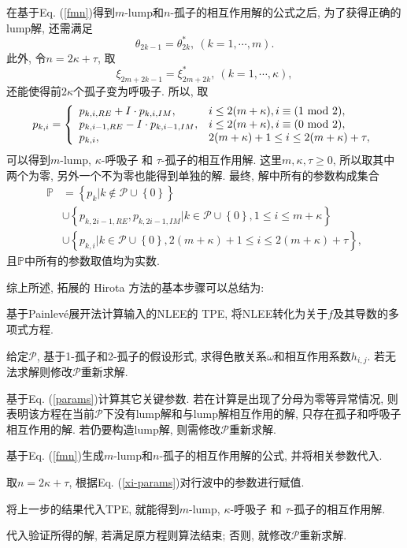 \documentclass[12pt,a4paper,UTF8]{article}
\numberwithin{equation}{section}
\newcommand{\bbrace}[1]{\left\{#1\right\}}
\newcommand{\PS}{\mathcal{P}}
\renewcommand{\mod}{{\rm ~mod~}}
\newcommand{\Painleve}{Painlev{\'e}}
\newcommand{\refeqn}[1]{Eq. (\ref{#1})}
\newcommand{\MLNS}{$m$-lump和$n$-孤子的相互作用解}
\begin{document}
在基于\refeqn{fmn}得到\MLNS{}的公式之后, 为了获得正确的lump解, 还需满足
\begin{equation}
  \theta_{2k-1}=\theta_{2k}^*, ~(k=1,\cdots,m).
\end{equation}
此外, 令$n=2\kappa+\tau$, 取
\begin{equation}
  \xi_{2m+2k-1}=\xi_{2m+2k}^*, ~(k=1,\cdots,\kappa),
\end{equation}
还能使得前$2\kappa$个孤子变为呼吸子. 所以, 取
\begin{equation}
p_{k,i}=\left\{
\begin{array}{ll}
  p_{k,i,RE}+I\cdot p_{k,i,IM}, & i\le 2(m+\kappa), i\equiv(1 \mod 2),\\
  p_{k,i-1,RE}-I\cdot p_{k,i-1,IM}, & i\le 2(m+\kappa), i\equiv(0 \mod 2),\\
  p_{k,i}, & 2(m+\kappa)+1 \le i \le 2(m+\kappa)+\tau ,
\end{array}
\right.
\end{equation}
可以得到$m$-lump, $\kappa$-呼吸子 和 $\tau$-孤子的相互作用解. 这里$m,\kappa,\tau\ge 0$, 所以取其中两个为零, 另外一个不为零也能得到单独的解. 最终, 解中所有的参数构成集合
\begin{equation}
\begin{aligned}
\mathbb{P}
&=\bbrace{p_k|k\not\in \PS\cup\bbrace{0}} \\
&\cup\bbrace{p_{k,2i-1,RE},p_{k,2i-1,IM}|k\in\PS\cup\bbrace{0},1\le i \le m+\kappa} \\
&\cup\bbrace{p_{k,i}|k\in\PS\cup\bbrace{0},2(m+\kappa)+1 \le i \le 2(m+\kappa)+\tau},
\end{aligned}
\label{xi-params}
\end{equation}
且$\mathbb P$中所有的参数取值均为实数. 

综上所述, 拓展的 Hirota 方法的基本步骤可以总结为: 
\begin{compactenum}[Step 1.]
\item 基于\Painleve{}展开法计算输入的NLEE的 TPE, 将NLEE转化为关于$f$及其导数的多项式方程. 
\item 给定$\PS$, 基于1-孤子和2-孤子的假设形式, 求得色散关系$\omega$和相互作用系数$h_{i,j}$. 若无法求解则修改$\PS$重新求解. 
\item 基于\refeqn{params}计算其它关键参数. 若在计算是出现了分母为零等异常情况, 则表明该方程在当前$\PS$下没有lump解和与lump解相互作用的解, 只存在孤子和呼吸子相互作用的解. 若仍要构造lump解, 则需修改$\PS$重新求解. 
\item 基于\refeqn{fmn}生成\MLNS{}的公式, 并将相关参数代入. 
\item 取$n=2\kappa+\tau$, 根据\refeqn{xi-params}对行波中的参数进行赋值.
\item 将上一步的结果代入TPE, 就能得到$m$-lump, $\kappa$-呼吸子 和 $\tau$-孤子的相互作用解.
\item 代入验证所得的解, 若满足原方程则算法结束; 否则, 就修改$\PS$重新求解. 
\end{compactenum}
\end{document}
